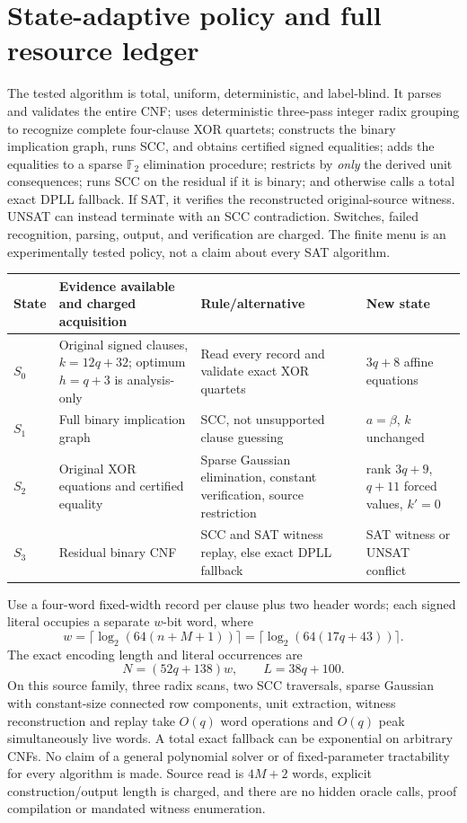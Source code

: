 \documentclass[11pt]{article}
\begin{document}
\section{State-adaptive policy and full resource ledger}
The tested algorithm is total, uniform, deterministic, and
label-blind. It parses and validates the entire CNF; uses
deterministic three-pass integer radix grouping to recognize complete
four-clause XOR quartets; constructs the binary implication graph,
runs SCC, and obtains certified signed equalities; adds the equalities
to a sparse $\mathbb F_2$ elimination procedure; restricts by
\emph{only} the derived unit consequences; runs SCC on the residual
if it is binary; and otherwise calls a total exact DPLL fallback.
If SAT, it verifies the reconstructed original-source witness.
UNSAT can instead terminate with an SCC contradiction.
Switches, failed recognition, parsing, output, and verification
are charged. The finite menu is an experimentally tested policy,
not a claim about every SAT algorithm.

\begin{center}\small
\begin{tabular}{@{}p{.11\linewidth}p{.27\linewidth}p{.30\linewidth}p{.23\linewidth}@{}}\toprule
State & Evidence available and charged acquisition & Rule/alternative & New state\\\midrule
$S_0$ & Original signed clauses, $k=12q+32$; optimum $h=q+3$ is analysis-only & Read every record and validate exact XOR quartets & $3q+8$ affine equations\\
$S_1$ & Full binary implication graph & SCC, not unsupported clause guessing & $a=\beta$, $k$ unchanged\\
$S_2$ & Original XOR equations and certified equality & Sparse Gaussian elimination, constant verification, source restriction & rank $3q+9$, $q+11$ forced values, $k'=0$\\
$S_3$ & Residual binary CNF & SCC and SAT witness replay, else exact DPLL fallback & SAT witness or UNSAT conflict\\\bottomrule
\end{tabular}
\end{center}

Use a four-word fixed-width record per clause plus two header words;
each signed literal occupies a separate $w$-bit word, where
\[
w=\lceil\log_2(64(n+M+1))\rceil
 =\lceil\log_2(64(17q+43))\rceil .
\]
The exact encoding length and literal occurrences are
\[
\boxed{N=(52q+138)w,\qquad L=38q+100.}\tag{8}
\]
On this source family, three radix scans, two SCC traversals, sparse
Gaussian with constant-size connected row components, unit extraction,
witness reconstruction and replay take $O(q)$ word operations and
$O(q)$ peak simultaneously live words. A total exact fallback can be
exponential on arbitrary CNFs. No claim of a general polynomial solver
or of fixed-parameter tractability for every algorithm is made.
Source read is $4M+2$ words, explicit construction/output length is
charged, and there are no hidden oracle calls, proof compilation or
mandated witness enumeration.
\end{document}

